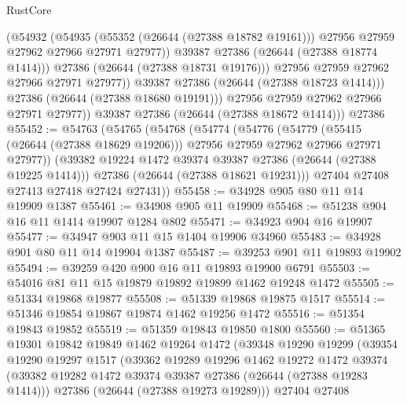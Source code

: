 \begin{lexlean}{RustCore}
\begin{coremodule}
                      (@54932
                        (@54935
                          (@55352 (@26644 (@27388 @18782 @19161)))
                          @27956
                          @27959
                          @27962
                          @27966
                          @27971
                          @27977))
                      @39387
                      @27386
                      (@26644 (@27388 @18774 @1414)))
                    @27386
                    (@26644 (@27388 @18731 @19176)))
                  @27956
                  @27959
                  @27962
                  @27966
                  @27971
                  @27977))
              @39387
              @27386
              (@26644 (@27388 @18723 @1414)))
            @27386
            (@26644 (@27388 @18680 @19191)))
          @27956
          @27959
          @27962
          @27966
          @27971
          @27977))
      @39387
      @27386
      (@26644 (@27388 @18672 @1414)))
    @27386
@55452 := @54763
    (@54765
      (@54768
        (@54774
          (@54776
            (@54779
              (@55415 (@26644 (@27388 @18629 @19206)))
              @27956
              @27959
              @27962
              @27966
              @27971
              @27977))
          (@39382 @19224 @1472 @39374 @39387 @27386 (@26644 (@27388 @19225 @1414)))
          @27386
          (@26644 (@27388 @18621 @19231)))
        @27404
        @27408
        @27413
        @27418
        @27424
        @27431))
@55458 := @34928 @905 @80 @11 @14 @19909 @1387
@55461 := @34908 @905 @11 @19909
@55468 := @51238 @904 @16 @11 @1414 @19907 @1284 @802
@55471 := @34923 @904 @16 @19907
@55477 := @34947 @903 @11 @15 @1404 @19906 @34960
@55483 := @34928 @901 @80 @11 @14 @19904 @1387
@55487 := @39253 @901 @11 @19893 @19902
@55494 := @39259 @420 @900 @16 @11 @19893 @19900 @6791
@55503 := @54016 @81 @11 @15 @19879 @19892 @19899 @1462 @19248 @1472
@55505 := @51334 @19868 @19877
@55508 := @51339 @19868 @19875 @1517
@55514 := @51346 @19854 @19867 @19874 @1462 @19256 @1472
@55516 := @51354 @19843 @19852
@55519 := @51359 @19843 @19850 @1800
@55560 := @51365
    @19301
    @19842
    @19849
    @1462
    @19264
    @1472
    (@39348
      @19290
      @19299
      (@39354
        @19290
        @19297
        @1517
        (@39362
          @19289
          @19296
          @1462
          @19272
          @1472
          @39374
          (@39382 @19282 @1472 @39374 @39387 @27386 (@26644 (@27388 @19283 @1414)))
          @27386
          (@26644 (@27388 @19273 @19289)))
        @27404
        @27408

\end{coremodule}
\end{lexlean}
